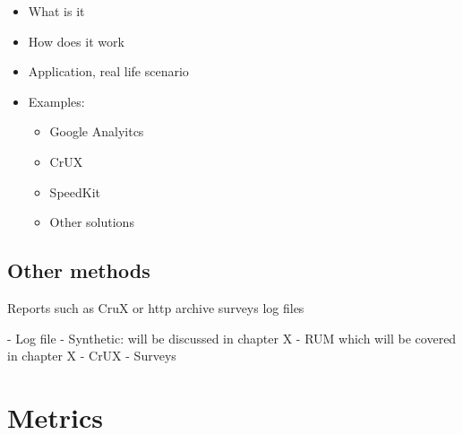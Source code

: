 \begin{itemize}
    \item What is it
    \item How does it work
    \item Application, real life scenario
    \item Examples:
    \begin{itemize}
        \item Google Analyitcs
        \item CrUX
        \item SpeedKit
        \item Other solutions
    \end{itemize}
\end{itemize}










\subsection{Other methods}

Reports such as CruX or http archive
surveys
log files



- Log file
- Synthetic: will be discussed in chapter X
- RUM which will be covered in chapter X
- CrUX
- Surveys







\section{Metrics}



